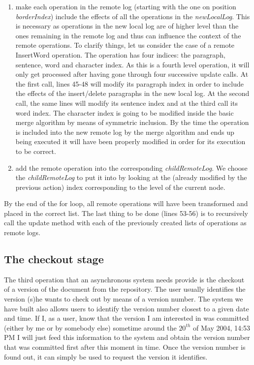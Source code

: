 \begin{enumerate}
\item make each operation in the remote log (starting with the one on position \emph{borderIndex}) include
      the effects of all the operations in the \emph{newLocalLog}. This is necessary as operations in the
      new local log are of higher level than the ones remaining in the remote log and thus can influence
      the context of the remote operations. To clarify things, let us consider the case of
      a remote InsertWord operation. The operation has four indices: the paragraph, sentence, word and character
      index. As this is a fourth level operation, it will only get processed after having gone through
      four successive update calls. At the first call, lines 45-48 will modify its paragraph index
      in order to include the effects of the insert/delete paragraphs in the new local log. At the second
      call, the same lines will modify its sentence index and at the third call its word index. The
      character index is going to be modified inside the basic merge algorithm by means of symmetric
      inclusion. By the time the operation is included into the new remote log by the merge algorithm and
      ends up being executed it will have been properly modified in order for its execution to be correct.
\item add the remote operation into the corresponding \emph{childRemoteLog}. We choose the \emph{childRemoteLog}
      to put it into by looking at the (already modified by the previous action) index corresponding to the
      level of the current node.
\end{enumerate}

By the end of the for loop, all remote operations will have been transformed and placed in the correct list.
The last thing to be done (lines 53-56) is to recursively call the update method with each of the previously
created lists of operations as remote logs.

\subsection{The checkout stage}

The third operation that an asynchronous system needs provide is the checkout of a version
of the document from the repository. The user usually identifies the version (s)he wants to check out by
means of a version number. The system we have built also allows users to identify the version number
closest to a given date and time. If I, as a user, know that the version I am interested in was committed
(either by me or by somebody else) sometime around the $20^{th}$ of May 2004, 14:53 PM I will just feed
this information to the system and obtain the version number that was committed first after this moment
in time. Once the version number is found out, it can simply be used to request the version it identifies.

